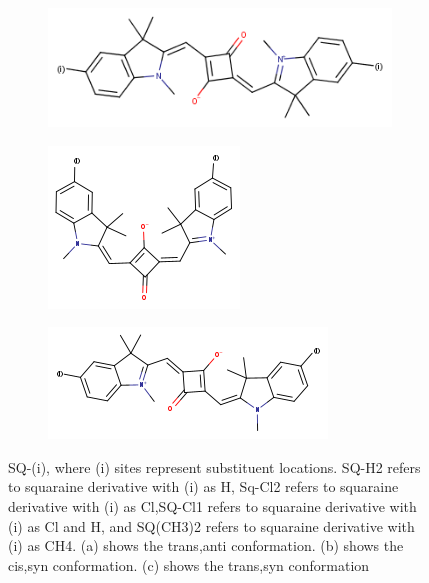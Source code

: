 \documentclass[journal=jacsat,manuscript=article]{achemso}
\begin{document}
\begin{figure}[h]
\begin{subfigure}{.45\textwidth}
    \centering
    \includegraphics[width=.8\linewidth]{figures/SQi.png}
    \caption{}
\end{subfigure}
\begin{subfigure}{.45\textwidth}
    \centering
    \includegraphics[width=.5\linewidth]{figures/sqi-cis.png}
    \caption{}
\end{subfigure}
\begin{subfigure}{.65\textwidth}
    \centering
    \includegraphics[width=.5\linewidth]{figures/sqi-trans.png}
    \caption{}
\end{subfigure}
    \caption{SQ-(i), where (i) sites represent substituent locations. SQ-H2 refers to squaraine derivative with (i) as H, Sq-Cl2 refers to squaraine derivative with (i) as Cl,SQ-Cl1 refers to squaraine derivative with (i) as Cl and H, and SQ(CH3)2 refers to squaraine derivative with (i) as CH4. (a) shows the trans,anti conformation. (b) shows the cis,syn conformation. (c) shows the trans,syn conformation
}
    \label{fig:SQ dye}
\end{figure}


\end{document}
